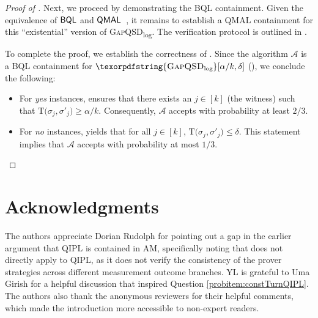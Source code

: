 \documentclass[10pt,a4paper]{article}
\numberwithin{equation}{section}
\numberwithin{figure}{section}
\newcommand{\AM}{\textnormal{\textsf{AM}}\xspace}
\newcommand{\QIPL}{\textnormal{\textsf{QIPL}}\xspace}
\newcommand{\QMAL}{\textnormal{\textsf{QMAL}}\xspace}
\newcommand{\BQL}{\textnormal{\textsf{BQL}}\xspace}
\newcommand{\GapQSDlog}{\texorpdfstring{\textnormal{\textsc{GapQSD}\textsubscript{log}}}\xspace}
\newcommand{\IndivProdQSD}{\textnormal{\textsc{IndivProdQSD}}\xspace}
\newcommand{\td}{\mathrm{T}}
\newcommand{\calA}{\mathcal{A}}
\begin{document}
\begin{proof}[Proof of ]
    \vspace{1em}
    Next, we proceed by demonstrating the \BQL{} containment. Given the equivalence of $\BQL$ and  $\QMAL$~\cite{FKLMN16,FR21}, it remains to establish a \QMAL{} containment for this ``existential'' version of \GapQSDlog{}. The verification protocol is outlined in . 


    To complete the proof, we establish the correctness of . Since the algorithm $\calA$ is a \BQL{} containment for $\GapQSDlog[\alpha/k,\delta]$ (), we conclude the following: 
    \begin{itemize}[topsep=0.33em, itemsep=0.33em, parsep=0.33em]
        \item For \textit{yes} instances,  ensures that there exists an  $j \in [k]$ (the witness) such that $\td\big(\sigma_j, \sigma'_j\big) \geq \alpha/k$. Consequently, $\calA$ accepts with probability at least $2/3$. 
        \item For \textit{no} instances,  yields that for all $j \in [k]$, $\td\big(\sigma_j, \sigma'_j\big) \leq \delta$. This statement implies that $\calA$ accepts with probability at most $1/3$. \qedhere
    \end{itemize}
\end{proof}


\section*{Acknowledgments}
\noindent
The authors appreciate Dorian Rudolph for pointing out a gap in the earlier argument that \QIPL{} is contained in \AM{}, specifically noting that  does not directly apply to \QIPL{}, as it does not verify the consistency of the prover strategies across different measurement outcome branches. 
YL is grateful to Uma Girish for a helpful discussion that inspired Question \ref{probitem:constTurnQIPL}. 
The authors also thank the anonymous reviewers for their helpful comments, which made the introduction more accessible to non-expert readers. 
\end{document}
